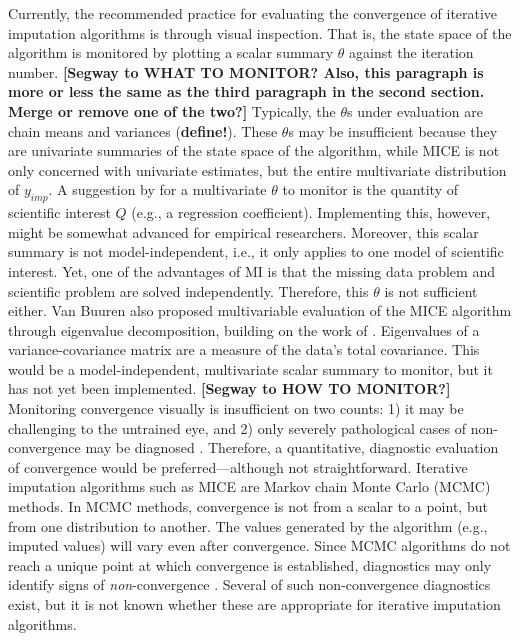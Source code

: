 \documentclass[Royal,times,sageh]{sagej}
\begin{document}
Currently, the recommended practice for evaluating the convergence of iterative imputation algorithms is through visual inspection. That is, the state space of the algorithm is monitored by plotting a scalar summary \(\theta\) against the iteration number.
\textbf{{[}Segway to WHAT TO MONITOR? Also, this paragraph is more or less the same as the third paragraph in the second section. Merge or remove one of the two?{]}} Typically, the \(\theta\)s under evaluation are chain means and variances (\textbf{define!}). These \(\theta\)s may be insufficient because they are univariate summaries of the state space of the algorithm, while MICE is not only concerned with univariate estimates, but the entire multivariate distribution of \(y_{imp}\). A suggestion by \citet{buur18} for a multivariate \(\theta\) to monitor is the quantity of scientific interest \(Q\) (e.g., a regression coefficient). Implementing this, however, might be somewhat advanced for empirical researchers. Moreover, this scalar summary is not model-independent, i.e., it only applies to one model of scientific interest. Yet, one of the advantages of MI is that the missing data problem and scientific problem are solved independently. Therefore, this \(\theta\) is not sufficient either. Van Buuren \citeyearpar[\(\S\) 4.5.2]{buur18} also proposed multivariable evaluation of the MICE algorithm through eigenvalue decomposition, building on the work of \citet{mack03}. Eigenvalues of a variance-covariance matrix are a measure of the data's total covariance. This would be a model-independent, multivariate scalar summary to monitor, but it has not yet been implemented.
\textbf{{[}Segway to HOW TO MONITOR?{]}} Monitoring convergence visually is insufficient on two counts: 1) it may be challenging to the untrained eye, and 2) only severely pathological cases of non-convergence may be diagnosed \citep[\(\S\) 6.5.2]{buur18}. Therefore, a quantitative, diagnostic evaluation of convergence would be preferred---although not straightforward. Iterative imputation algorithms such as MICE are Markov chain Monte Carlo (MCMC) methods. In MCMC methods, convergence is not from a scalar to a point, but from one distribution to another. The values generated by the algorithm (e.g., imputed values) will vary even after convergence. Since MCMC algorithms do not reach a unique point at which convergence is established, diagnostics may only identify signs of \emph{non}-convergence \citep{hoff09}. Several of such non-convergence diagnostics exist, but it is not known whether these are appropriate for iterative imputation algorithms.
\end{document}
